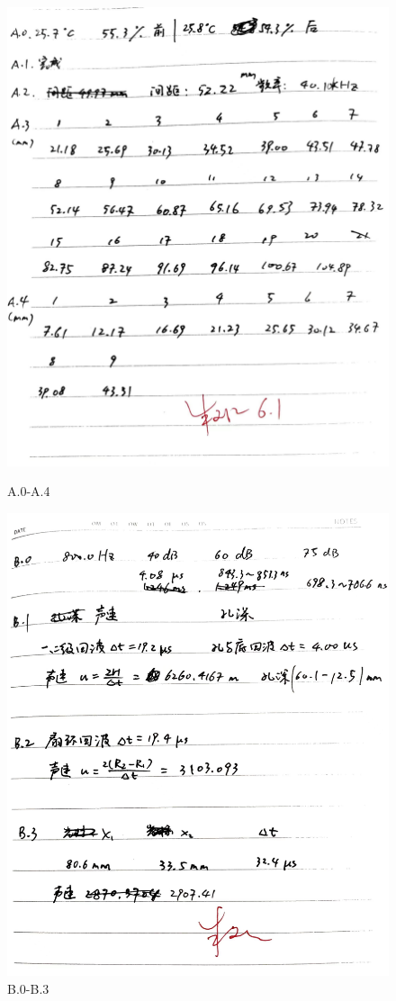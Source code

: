 \documentclass[UTF8,a4paper]{article}%
\begin{document}
\begin{figure}[H] %
    \centering
    \begin{minipage}[t]{0.5\linewidth}
        \centering
        \includegraphics[width=0.95\linewidth]{1.jpg}
        \caption{A.0-A.4}
    \end{minipage}%
    \begin{minipage}[t]{0.5\linewidth}
        \centering
        \includegraphics[width=0.95\linewidth]{2.jpg}
        \caption{B.0-B.3}
    \end{minipage}
\end{figure}
\end{document}
